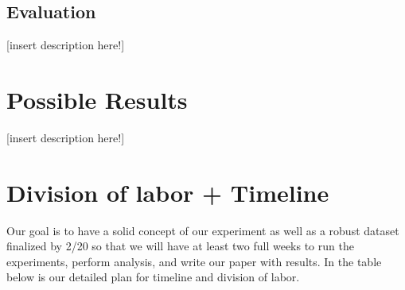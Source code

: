 \documentclass[11pt,a4paper]{article}
\begin{document}
\subsection{Evaluation}


\vspace{5mm}
[insert description here!]

\vspace{15mm}






\section{Possible Results}
\vspace{5mm}
[insert description here!]

\vspace{15mm}





\section{Division of labor + Timeline}
Our goal is to have a solid concept of our experiment as well as a robust dataset finalized by 2/20 so that we will have at least two full weeks to run the experiments, perform analysis, and write our paper with results. In the table below is our detailed plan for timeline and division of labor.

\clearpage
\end{document}
